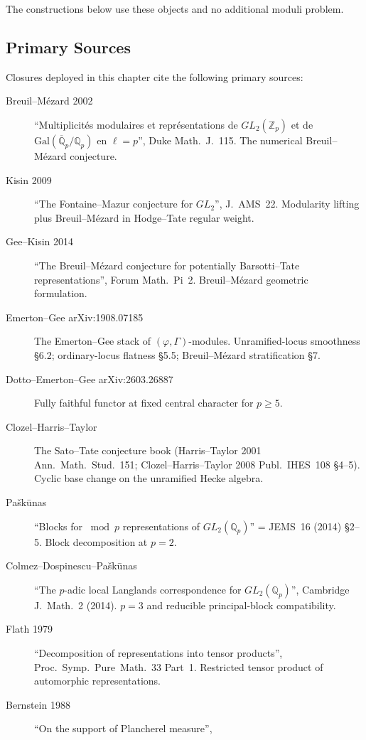 The constructions below use these objects and no additional moduli
problem.

\subsection{Primary Sources}
\label{v4-arith:w5-e:sources}

Closures deployed in this chapter cite the following primary sources:
\begin{description}
\item[Breuil--M{\'e}zard 2002] ``Multiplicit{\'e}s modulaires et
repr{\'e}sentations de \(GL_{2}(\mathbb{Z}_{p})\) et de
\(\mathrm{Gal}(\overline{\mathbb{Q}}_{p}/\mathbb{Q}_{p})\) en
\(\ell = p\)'', Duke Math.~J.~115. The numerical Breuil--M{\'e}zard
conjecture.
\item[Kisin 2009] ``The Fontaine--Mazur conjecture for \(GL_{2}\)'',
J.~AMS~22. Modularity lifting plus Breuil--M{\'e}zard in
Hodge--Tate regular weight.
\item[Gee--Kisin 2014] ``The Breuil--M{\'e}zard conjecture for
potentially Barsotti--Tate representations'', Forum Math.~Pi~2.
Breuil--M{\'e}zard geometric formulation.
\item[Emerton--Gee arXiv:1908.07185] The Emerton--Gee stack of
\((\varphi,\Gamma)\)-modules. Unramified-locus smoothness \S 6.2;
ordinary-locus flatness \S 5.5; Breuil--M{\'e}zard stratification \S 7.
\item[Dotto--Emerton--Gee arXiv:2603.26887] Fully faithful functor at
fixed central character for \(p\geq 5\).
\item[Clozel--Harris--Taylor] The Sato--Tate conjecture book
(Harris--Taylor 2001 Ann.~Math.~Stud.~151; Clozel--Harris--Taylor 2008
Publ.~IHES~108 \S 4--5). Cyclic base change on the unramified Hecke
algebra.
\item[Pa{\v s}k{\=u}nas] ``Blocks for \(\bmod{p}\)
representations of \(GL_{2}(\mathbb{Q}_{p})\)'' = JEMS~16 (2014) \S 2--5.
Block decomposition at \(p=2\).
\item[Colmez--Dospinescu--Pa{\v s}k{\=u}nas]
``The \(p\)-adic local Langlands correspondence for \(GL_{2}(\mathbb{Q}_{p})\)'',
Cambridge J.~Math.~2 (2014). \(p=3\) and reducible
principal-block compatibility.
\item[Flath 1979] ``Decomposition of representations into tensor
products'', Proc.~Symp.~Pure~Math.~33 Part~1. Restricted tensor
product of automorphic representations.
\item[Bernstein 1988] ``On the support of Plancherel measure'',

\end{description}
